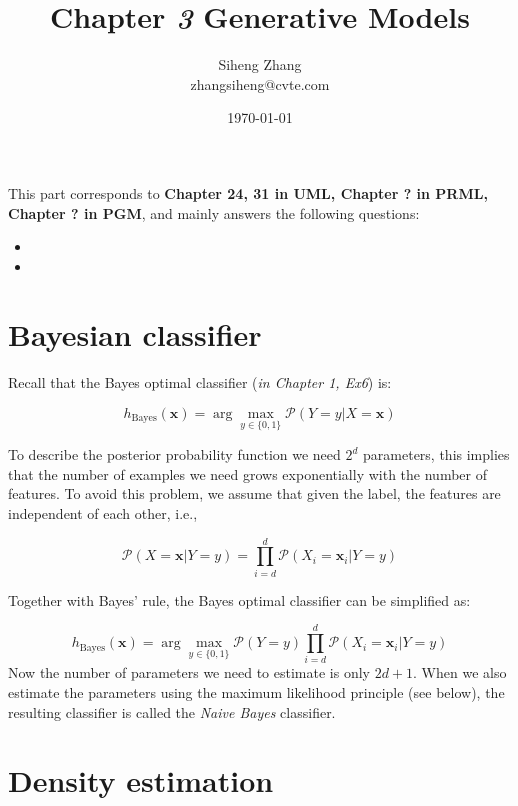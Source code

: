 \documentclass{article}
\author{Siheng Zhang\\zhangsiheng@cvte.com}
\title{Chapter \textbf{\textit{3}} Generative Models}
\date{\today}
\begin{document}
\maketitle  

This part corresponds to \textbf{Chapter 24, 31 in UML, Chapter ? in PRML, Chapter ? in PGM}, and mainly answers the following questions:

\begin{itemize}
\item 
\item 
\end{itemize}

\tableofcontents
\newpage

\section{Bayesian classifier}

	Recall that the Bayes optimal classifier (\textit{in Chapter 1, Ex6}) is:
	
	\begin{equation*}
	h_{\mathrm{Bayes}}(\mathbf{x}) = \arg\max\limits_{y\in\{0,1\}} \mathcal{P} (Y=y|X=\mathbf{x})
	\end{equation*}
	
	To describe the posterior probability function we need $2^d$ parameters, this implies that the number of examples we need grows exponentially with the number of features. To avoid this problem, we assume that given the label, the features are independent of each other, i.e., 
	
	\begin{equation*}
	\mathcal{P} (X=\mathbf{x}|Y=y) = \prod_{i=d}^d \mathcal{P} (X_i=\mathbf{x}_i|Y=y)
	\end{equation*}
	
	Together with Bayes' rule, the Bayes optimal classifier can be simplified as:
	
	\begin{equation}
	h_{\mathrm{Bayes}}(\mathbf{x}) = \arg\max\limits_{y\in\{0,1\}} \mathcal{P} (Y=y) \prod_{i=d}^d \mathcal{P} (X_i=\mathbf{x}_i|Y=y)
	\end{equation}
Now the number of parameters we need to estimate is only $2d + 1$. When we also estimate the parameters using the maximum likelihood principle (see below), the resulting classifier is called the \textit{Naive Bayes} classifier.

\section{Density estimation}
\end{document}
